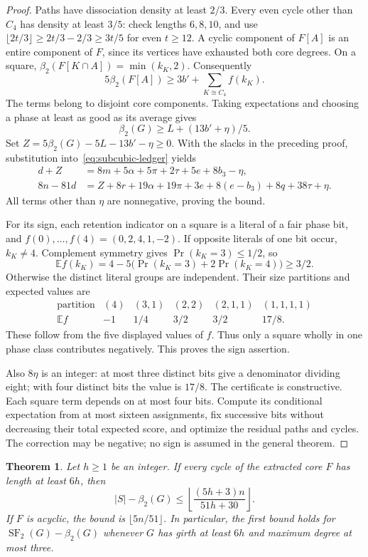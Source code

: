 \documentclass[11pt]{article}
\newtheorem{theorem}{Theorem}
\newcommand{\SF}{\operatorname{SF}_2}
\newcommand{\diss}{\beta_2}
\begin{document}
\begin{proof}
Paths have dissociation density at least $2/3$. Every even cycle other
than $C_4$ has density at least $3/5$: check lengths $6,8,10$, and use
$\lfloor2t/3\rfloor\ge2t/3-2/3\ge3t/5$ for even $t\ge12$.
A cyclic component of $F[A]$ is an entire component of $F$, since its
vertices have exhausted both core degrees. On a square,
$\diss(F[K\cap A])=\min(k_K,2)$. Consequently
\[
 5\diss(F[A])\ge3b'+\sum_{K\cong C_4}f(k_K).
\]
The terms belong to disjoint core components. Taking expectations and
choosing a phase at least as good as its average gives
\[
 \diss(G)\ge L+(13b'+\eta)/5.
\]
Set $Z=5\diss(G)-5L-13b'-\eta\ge0$. With the slacks in the preceding
proof, substitution into~\eqref{eq:subcubic-ledger} yields
\begin{align*}
 d+Z&=8m+5\alpha+5\pi+2\tau+5e+8b_3-\eta,\\
 8n-81d&=Z+8r+19\alpha+19\pi+3e
            +8(e-b_3)+8q+38\tau+\eta.
\end{align*}
All terms other than $\eta$ are nonnegative, proving the bound.

For its sign, each retention indicator on a square is a literal of a
fair phase bit, and $f(0),\ldots,f(4)=(0,2,4,1,-2)$. If opposite
literals of one bit occur, $k_K\ne4$. Complement symmetry gives
$\Pr(k_K=3)\le1/2$, so
\[
 \mathbb E f(k_K)
 =4-5\bigl(\Pr(k_K=3)+2\Pr(k_K=4)\bigr)\ge3/2.
\]
Otherwise the distinct literal groups are independent. Their size partitions and expected values are
\[
 \begin{array}{c|ccccc}
 \text{partition}&(4)&(3,1)&(2,2)&(2,1,1)&(1,1,1,1)\\
 \mathbb E f&-1&1/4&3/2&3/2&17/8.
 \end{array}
\]
These follow from the five displayed values of $f$. Thus only a square wholly in one phase class contributes
negatively. This proves the sign assertion.

Also $8\eta$ is an integer: at most three distinct bits give a
denominator dividing eight; with four distinct bits the value is $17/8$.
The certificate is constructive. Each square term depends on at most
four bits. Compute its conditional expectation from at most sixteen
assignments, fix successive bits without decreasing their total expected
score, and optimize the residual paths and cycles. The correction may
be negative; no sign is assumed in the general theorem.
\end{proof}

\begin{theorem}\label{thm:core-girth}
Let $h\ge1$ be an integer. If every cycle of the extracted core $F$ has
length at least $6h$, then
\[
 |S|-\diss(G)\le\left\lfloor\frac{(5h+3)n}{51h+30}\right\rfloor.
\]
If $F$ is acyclic, the bound is $\lfloor5n/51\rfloor$. In particular,
the first bound holds for $\SF(G)-\diss(G)$ whenever $G$ has girth at
least $6h$ and maximum degree at most three.
\end{theorem}
\end{document}
